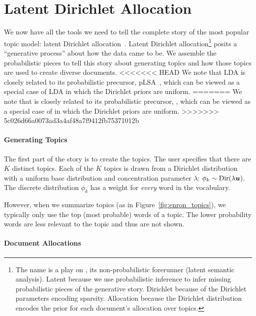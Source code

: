 \section{Latent Dirichlet Allocation}
\label{sec:lda}

We now have all the tools we need to tell the complete story of the most popular topic model: latent Dirichlet allocation~\citep{blei-03}.  Latent
Dirichlet allocation\footnote{The name  is a play on , its
  non-probabilistic forerunner (latent semantic analysis).  Latent because we
  use probabilistic inference to infer missing probabilistic pieces of the
  generative story.  Dirichlet because of the Dirichlet parameters encoding
  sparsity.  Allocation because the Dirichlet distribution encodes the prior for
  each document's allocation over topics.} posits a ``generative process'' about
how the data came to be.  We assemble the probabilistic pieces to tell
this story about generating topics and how those topics are used to create
diverse documents.
<<<<<<< HEAD
We note that LDA is closely related to its probabilistic precursor, pLSA~\citep{hofmann-99}, which can be viewed as a special case of LDA in which the Dirichlet priors are uniform.
=======
We note that  is closely related to its probabilistic precursor,  \citep{hofmann-99}, 
which can be viewed as a special case of  in which the Dirichlet priors are uniform.
>>>>>>> 5c026d66a0073ad3a4af48a7f9412fb75371012b

\paragraph{Generating Topics}

The first part of the story is to create the topics.  The user specifies that
there are $K$ distinct topics.  Each of the $K$ topics is drawn from a Dirichlet
distribution with a uniform base distribution and concentration parameter
$\lambda$: $\phi_k \sim \mbox{Dir}(\lambda {\bm u})$.  The discrete distribution
$\phi_k$ has a weight for \emph{every} word in the vocabulary.

However, when we summarize topics (as in
Figure~\ref{fig:enron_topics}), we typically only use the top (most probable) words of
a topic.  The lower probability words are less relevant to the topic
and thus are not shown.

\paragraph{Document Allocations}

